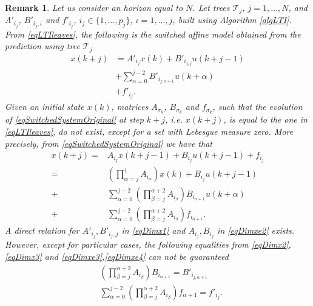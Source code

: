 \documentclass[]{ifacconf}  %
\newtheorem{remark}{Remark}
\begin{document}
\begin{remark}
	Let us consider an horizon equal to $N$. 
	Let trees $\mathcal{T}_j$, $j=1,\ldots,N$, and $A'_{i_j}$, $B'_{i_j,\iota}$ and $f'_{i_j}$, $i_j\in\{1,\ldots,p_j\}$, $\iota=1,\ldots,j$, built using Algorithm \ref{algLTI}.
	From \eqref{eqLTIleaves}, the following is the switched affine model obtained from the prediction using tree $\mathcal{T}_j$
	\small
	\begin{align}
	x(k+j) &= A'_{i_j}x(k) + B'_{i_{j,j}}u(k+j-1)\label{eqDimx1}\\
	&+\sum_{\alpha=0}^{j-2}{B'_{i_{j,\alpha+1}}u(k+\alpha)}\label{eqDimx2}\\
	&+f'_{i_j}.\label{eqDimx3}
	\end{align}
	\normalsize
	Given an initial state $x(k)$, matrices $A_{\sigma_k}$, $B_{\sigma_k}$ and $f_{\sigma_k}$, such that the evolution of \eqref{eqSwitchedSystemOriginal} at step $k+j$, i.e. $x(k+j)$, is equal to the one in \eqref{eqLTIleaves}, do not exist, except for a set with Lebesgue measure zero. More precisely, from \eqref{eqSwitchedSystemOriginal} we have that
	\small
	\begin{align}
	x(k+j) = &A_{i_j}x(k+j-1) + B_{i_j}u(k+j-1) + f_{i_j}\label{eqDimxe1}\\
	= &\left(\prod_{\alpha=j}^{1}{A_{i_\alpha}}\right)x(k) + B_{i_j}u(k+j-1)\label{eqDimxe2}\\
	+&\sum_{\alpha=0}^{j-2}{\left(\prod_{\beta=j}^{\alpha + 2}{A_{i_\beta}}\right)B_{i_{\alpha+1}}u(k + \alpha)}\label{eqDimxe3}\\
	+&\sum_{\alpha=0}^{j-2}{\left(\prod_{\beta=j}^{\alpha + 2}{A_{i_\beta}}\right)f_{i_{\alpha+1}}}\label{eqDimxe4}.
	\end{align}
	\normalsize
	A direct relation for $A'_{i_j},B'_{i_j,j}$ in \eqref{eqDimx1} and $A_{i_j},B_{i_j}$ in \eqref{eqDimxe2} exists. However, except for particular cases, the following equalities from \eqref{eqDimx2},\eqref{eqDimx3} and \eqref{eqDimxe3},\eqref{eqDimxe4} can not be guaranteed
	\small
	\begin{align}
	&\left(\prod_{\beta=j}^{\alpha + 2}{A_{i_\beta}}\right)B_{i_{\alpha+1}} = B'_{i_{j,\alpha+1}}\\
	&\sum_{\alpha=0}^{j-2}{\left(\prod_{\beta=j}^{\alpha + 2}{A_{i_\beta}}\right)f_{\alpha+1}} = f'_{i_j}.
	\end{align}
	\normalsize
\end{remark}
\end{document}
